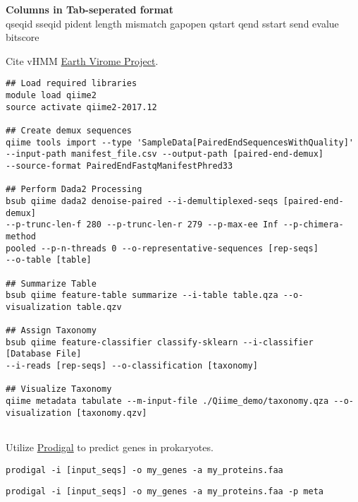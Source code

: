 \documentclass[idxtotoc,hyperref,openany,oneside]{labbook} %
\begin{document}
\textbf{Columns in Tab-seperated format} \\
qseqid  sseqid  pident  length  mismatch  gapopen qstart  qend  sstart  send  evalue  bitscore


Cite vHMM \href{http://portal.nersc.gov/dna/microbial/prokpubs/EarthVirome_DP/}{Earth Virome Project}. 

\begin{verbatim}
## Load required libraries
module load qiime2
source activate qiime2-2017.12

## Create demux sequences
qiime tools import --type 'SampleData[PairedEndSequencesWithQuality]' 
--input-path manifest_file.csv --output-path [paired-end-demux] 
--source-format PairedEndFastqManifestPhred33

## Perform Dada2 Processing 
bsub qiime dada2 denoise-paired --i-demultiplexed-seqs [paired-end-demux]
--p-trunc-len-f 280 --p-trunc-len-r 279 --p-max-ee Inf --p-chimera-method 
pooled --p-n-threads 0 --o-representative-sequences [rep-seqs] 
--o-table [table]

## Summarize Table
bsub qiime feature-table summarize --i-table table.qza --o-visualization table.qzv

## Assign Taxonomy
bsub qiime feature-classifier classify-sklearn --i-classifier [Database File]
--i-reads [rep-seqs] --o-classification [taxonomy]

## Visualize Taxonomy
qiime metadata tabulate --m-input-file ./Qiime_demo/taxonomy.qza --o-visualization [taxonomy.qzv]


\end{verbatim}






Utilize \href{https://github.com/hyattpd/Prodigal}{Prodigal} to predict genes in prokaryotes.


\begin{verbatim}
prodigal -i [input_seqs] -o my_genes -a my_proteins.faa
\end{verbatim} 


\begin{verbatim}
prodigal -i [input_seqs] -o my_genes -a my_proteins.faa -p meta
\end{verbatim} 
\end{document}
